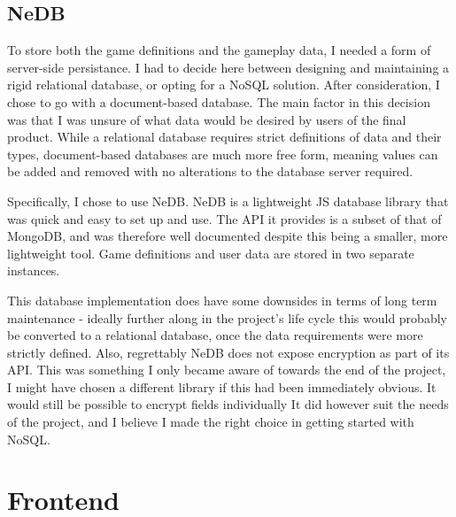 \subsection{NeDB}
To store both the game definitions and the gameplay data, I needed a form of server-side persistance. I had to decide here between designing and maintaining a rigid relational database, or opting for a NoSQL\cite{NoSQL} solution. After consideration, I chose to go with a document-based database. The main factor in this decision was that I was unsure of what data would be desired by users of the final product. While a relational database requires strict definitions of data and their types, document-based databases are much more free form, meaning values can be added and removed with no alterations to the database server required.

Specifically, I chose to use NeDB\cite{NeDB}. NeDB is a lightweight JS database library that was quick and easy to set up and use. The API it provides is a subset of that of MongoDB\cite{MongoDB}, and was therefore well documented despite this being a smaller, more lightweight tool. Game definitions and user data are stored in two separate instances.

This database implementation does have some downsides in terms of long term maintenance - ideally further along in the project's life cycle this would probably be converted to a relational database, once the data requirements were more strictly defined. Also, regrettably NeDB does not expose encryption as part of its API.
This was something I only became aware of towards the end of the project, I might have chosen a different library if this had been immediately obvious. It would still be possible to encrypt fields individually
It did however suit the needs of the project, and I believe I made the right choice in getting started with NoSQL.

\section{Frontend}

